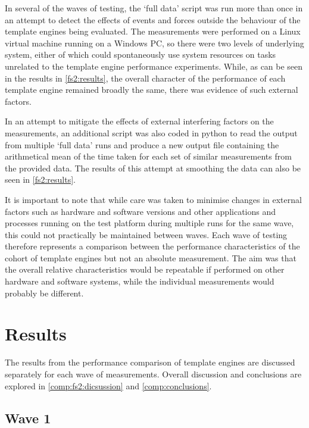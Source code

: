 In several of the waves of testing, the `full data' script was run more than once in an attempt to detect the effects of events and forces outside the behaviour of the template engines being evaluated. The measurements were performed on a Linux virtual machine running on a Windows PC, so there were two levels of underlying system, either of which could spontaneously use system resources on tasks unrelated to the template engine performance experiments. While, as can be seen in the results in \autoref{fs2:results}, the overall character of the performance of each template engine remained broadly the same, there was evidence of such external factors.

In an attempt to mitigate the effects of external interfering factors on the measurements, an additional script was also coded in python to read the output from multiple `full data' runs and produce a new output file containing the arithmetical mean of the time taken for each set of similar measurements from the provided data. The results of this attempt at smoothing the data can also be seen in \autoref{fs2:results}.

It is important to note that while care was taken to minimise changes in external factors such as hardware and software versions and other applications and processes running on the test platform during multiple runs for the same wave, this could not practically be maintained between waves. Each wave of testing therefore represents a comparison between the performance characteristics of the cohort of template engines but not an absolute measurement. The aim was that the overall relative characteristics would be repeatable if performed on other hardware and software systems, while the individual measurements would probably be different.

\section{Results}
\label{fs2:results}

The results from the performance comparison of template engines are discussed separately for each wave of measurements. Overall discussion and conclusions are explored in \autoref{comp:fs2:dicsussion} and  \autoref{comp:conclusions}.

\subsection{Wave 1}
\label{comp:wave 1}

